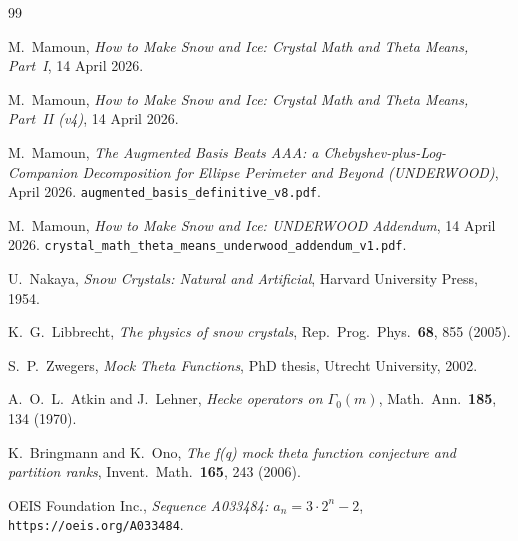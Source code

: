 \documentclass[11pt,letterpaper]{article}
\theoremstyle{plain}
\theoremstyle{definition}
\begin{document}
\begin{thebibliography}{99}

 M.~Mamoun,
\emph{How to Make Snow and Ice: Crystal Math and Theta Means,
Part~I}, 14 April 2026.

 M.~Mamoun,
\emph{How to Make Snow and Ice: Crystal Math and Theta Means,
Part~II (v4)}, 14 April 2026.

 M.~Mamoun,
\emph{The Augmented Basis Beats AAA: a Chebyshev-plus-Log-Companion
Decomposition for Ellipse Perimeter and Beyond (UNDERWOOD)},
April 2026.  \texttt{augmented\_basis\_definitive\_v8.pdf}.

 M.~Mamoun,
\emph{How to Make Snow and Ice: UNDERWOOD Addendum}, 14 April 2026.
\texttt{crystal\_math\_theta\_means\_underwood\_addendum\_v1.pdf}.

 U.~Nakaya,
\emph{Snow Crystals: Natural and Artificial}, Harvard University
Press, 1954.

 K.~G.~Libbrecht,
\emph{The physics of snow crystals},
Rep.~Prog.~Phys.~{\bf 68}, 855 (2005).

 S.~P.~Zwegers,
\emph{Mock Theta Functions}, PhD thesis, Utrecht University, 2002.

 A.~O.~L.~Atkin and J.~Lehner,
\emph{Hecke operators on $\Gamma_0(m)$},
Math.~Ann.~{\bf 185}, 134 (1970).

 K.~Bringmann and K.~Ono,
\emph{The f(q) mock theta function conjecture and partition ranks},
Invent.~Math.~{\bf 165}, 243 (2006).

 OEIS Foundation Inc., \emph{Sequence A033484:
$a_n = 3\cdot 2^n - 2$}, \texttt{https://oeis.org/A033484}.

\end{thebibliography}
\end{document}
